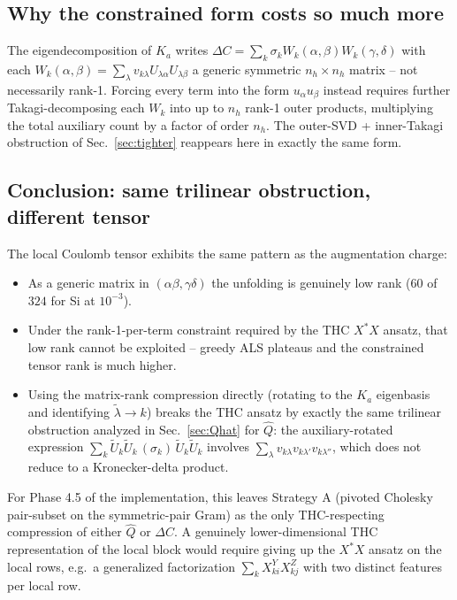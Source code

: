 \documentclass[aps,prb,reprint,superscriptaddress,nofootinbib]{revtex4-2}
\begin{document}
\subsection{Why the constrained form costs so much more}

The eigendecomposition of \(K_a\) writes
\(\Delta C\!=\!\sum_k\sigma_k W_k(\alpha,\beta)W_k(\gamma,\delta)\)
with each \(W_k(\alpha,\beta)=\sum_\lambda v_{k\lambda}U_{\lambda\alpha}U_{\lambda\beta}\)
a generic symmetric \(n_h\times n_h\) matrix -- not necessarily
rank-1.  Forcing every term into the form
\(u_\alpha u_\beta\) instead requires further Takagi-decomposing each
\(W_k\) into up to \(n_h\) rank-1 outer products, multiplying the
total auxiliary count by a factor of order \(n_h\).  The outer-SVD +
inner-Takagi obstruction of Sec.~\ref{sec:tighter} reappears here in
exactly the same form.

\subsection{Conclusion: same trilinear obstruction, different tensor}

The local Coulomb tensor exhibits the same pattern as the augmentation
charge:
\begin{itemize}
\item As a generic matrix in \((\alpha\beta,\gamma\delta)\) the
unfolding is genuinely low rank (\(60\) of \(324\) for Si at
\(10^{-3}\)).
\item Under the rank-1-per-term constraint required by the THC
\(X^{*}\!X\) ansatz, that low rank cannot be exploited -- greedy ALS
plateaus and the constrained tensor rank is much higher.
\item Using the matrix-rank compression directly (rotating to the
\(K_a\) eigenbasis and identifying \(\widetilde\lambda\to k\)) breaks
the THC ansatz by exactly the same trilinear obstruction analyzed in
Sec.~\ref{sec:Qhat} for \(\widehat Q\): the auxiliary-rotated
expression \(\sum_k\widetilde U_k\widetilde U_k\,(\sigma_k)\,\widetilde U_k\widetilde U_k\)
involves
\(\sum_\lambda v_{k\lambda}v_{k\lambda'}v_{k\lambda''}\), which does
not reduce to a Kronecker-delta product.
\end{itemize}
For Phase 4.5 of the implementation, this leaves Strategy A (pivoted
Cholesky pair-subset on the symmetric-pair Gram) as the only
THC-respecting compression of either \(\widehat Q\) or \(\Delta C\).
A genuinely lower-dimensional THC representation of the local block
would require giving up the \(X^{*}X\) ansatz on the local rows,
e.g.\ a generalized factorization
\(\sum_k X^Y_{ki}X^Z_{kj}\) with two distinct features per local row.
\end{document}
